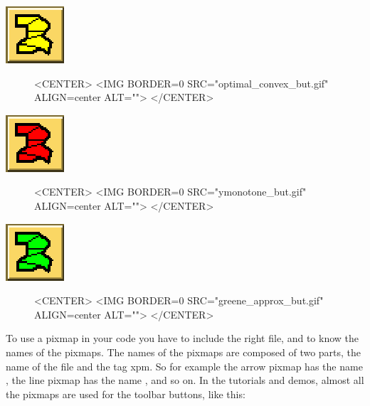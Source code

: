 \begin{ccTexOnly}
\mbox{\includegraphics{optimal_convex_but.eps}}
\end{ccTexOnly}
\begin{figure}
\begin{ccHtmlOnly}
<CENTER>
<IMG BORDER=0 SRC="optimal_convex_but.gif"  ALIGN=center  ALT="">
</CENTER>
\end{ccHtmlOnly}
\end{figure}

\begin{ccTexOnly}
\mbox{\includegraphics{ymonotone_but.eps}}
\end{ccTexOnly}
\begin{figure}
\begin{ccHtmlOnly}
<CENTER>
<IMG BORDER=0 SRC="ymonotone_but.gif"  ALIGN=center  ALT="">
</CENTER>
\end{ccHtmlOnly}
\end{figure}

\begin{ccTexOnly}
\mbox{\includegraphics{greene_approx_but.eps}}
\end{ccTexOnly}
\begin{figure}
\begin{ccHtmlOnly}
<CENTER>
<IMG BORDER=0 SRC="greene_approx_but.gif"  ALIGN=center  ALT="">
</CENTER>
\end{ccHtmlOnly}
\end{figure}

To use a pixmap in your code you have to include the right file, and
to know the names of the pixmaps. The names of the pixmaps are
composed of two parts, the name of the file and the tag xpm. So for
example the arrow pixmap has the name , the line
pixmap has the name , and so on. In the
tutorials and demos, almost all the pixmaps are used for the toolbar
buttons, like this:

